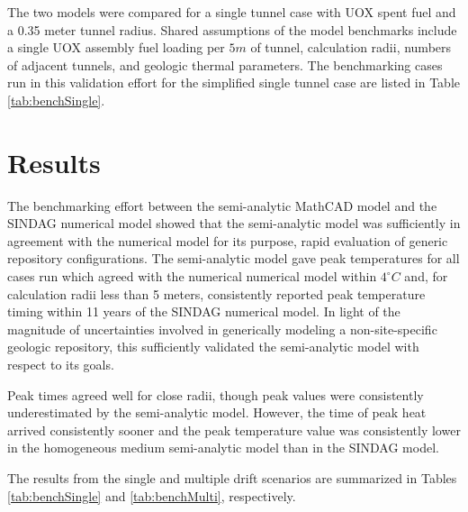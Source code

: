 The two models were compared for a single tunnel case with UOX spent fuel and a 
0.35 meter tunnel radius. Shared assumptions of the model benchmarks include a 
single UOX assembly fuel loading per $5m$ of tunnel, calculation radii, numbers 
of adjacent tunnels, and geologic thermal parameters. The benchmarking cases 
run in this validation effort for the simplified single 
tunnel case are listed in Table \ref{tab:benchSingle}. 


\section{Results}
The benchmarking effort between the semi-analytic MathCAD model and the 
\gls{SINDAG} numerical  model showed that the semi-analytic model was sufficiently 
in agreement with the numerical model for its purpose, rapid evaluation of 
generic repository configurations.  The semi-analytic model gave peak 
temperatures for all cases run which agreed with the numerical numerical model 
within $4^{\circ}C$ and, for calculation radii less than 5 meters, consistently 
reported peak temperature timing within 11 years of the \gls{SINDAG} numerical 
model. In light of the magnitude of uncertainties involved in generically 
modeling a non-site-specific geologic repository, this sufficiently validated 
the semi-analytic model with respect to its goals.

Peak times agreed well for close radii, though peak values were consistently 
underestimated by the semi-analytic model. However, the time of peak heat arrived 
consistently sooner and the peak temperature value was consistently lower in the 
homogeneous medium semi-analytic model than in the \gls{SINDAG} model. 

The results from the single and multiple drift scenarios are summarized in 
Tables \ref{tab:benchSingle} and \ref{tab:benchMulti}, respectively. 

